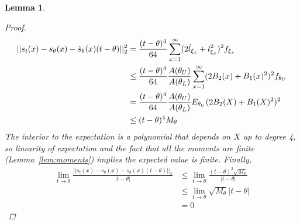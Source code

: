 \documentclass[11 pt]{article}
\newtheorem{lem}{Lemma}
\renewcommand{\th}{\theta}
\newcommand{\dsth}{\dot{s}_{\theta}}
\newcommand{\sth}{s_{\th}}
\begin{document}
\begin{lem}
\begin{proof}
\begin{align*}
||s_t(x) - \sth(x) - \dsth(x) (t - \th)||_2^2 &= \frac{(t-\th)^4}{64} \sum_{x=1}^{\infty} (2  \dot{l}_{\xix} + \lxix^2)^2\fxix \\
&\leq \frac{(t-\th)^4}{64} \frac{A(\thu)}{A(\thl)}\sum_{x=1}^{\infty} (2 B_2(x) + B_1(x)^2)^2f_{\thu} \\
&= \frac{(t-\th)^4}{64} \frac{A(\thu)}{A(\thl)}E_{\thu} (2 B_2(X) + B_1(X)^2)^2 \\
&\leq (t-\th)^4 M_{\th}
\end{align*}
The interior to the expectation is a polynomial that depends on $X$ up to degree 4, so linearity of expectation and the fact that all the moments are finite (Lemma~\ref{lem:moments}) implies the expected value is finite. Finally,
\begin{align*}
\lim_{t \rightarrow \th} \frac{||s_t(x) - \sth(x) - \dsth(x) (t - \th)||_2}{|t - \th|} &\leq \lim_{t \rightarrow \th} \frac{(t-\th)^2 \sqrt{M_{\th}}}{|t - \th|} \\
&\leq  \lim_{t \rightarrow \th} \sqrt{M_{\th}}|t - \th|\\
&= 0
\end{align*}
\end{proof}
\end{lem}
\end{document}
